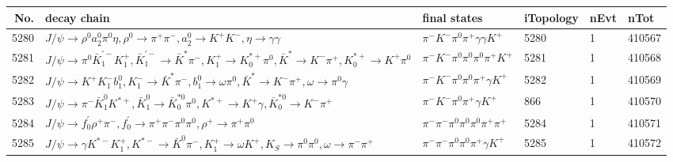 \begin{table}[htbp] 
\begin{center}
\begin{small}
\begin{tabular}{rlllll}\hline\hline
 No. & decay chain & final states &  iTopology & nEvt & nTot \\\hline
5280&$J/\psi       \rightarrow \rho^{0}      a_{2}^{0}      \pi^{0}        \eta          , \rho^{0}       \rightarrow \pi^{+}        \pi^{-}        , a_{2}^{0}       \rightarrow K^{+}          K^{-}          , \eta           \rightarrow \gamma       \gamma       $&$\pi^{-}        K^{-}          \pi^{0}        \pi^{+}        \gamma       \gamma       K^{+}          $& 5280&    1&410567\\
5281&$J/\psi       \rightarrow \pi^{0}        \bar{K}_1^{'-}K_1^{+}        , \bar{K}_1^{'-} \rightarrow \bar{K}^{*}   \pi^{-}        , K_1^{+}         \rightarrow K_{0}^{*+}     \pi^{0}        , \bar{K}^{*}    \rightarrow K^{-}          \pi^{+}        , K_{0}^{*+}      \rightarrow K^{+}          \pi^{0}        $&$\pi^{-}        K^{-}          \pi^{0}        \pi^{0}        \pi^{0}        \pi^{+}        K^{+}          $& 5281&    1&410568\\
5282&$J/\psi       \rightarrow K^{+}          K_{1}^{-}      b_{1}^{0}      , K_{1}^{-}       \rightarrow \bar{K}^{*}   \pi^{-}        , b_{1}^{0}       \rightarrow \omega         \pi^{0}        , \bar{K}^{*}    \rightarrow K^{-}          \pi^{+}        , \omega          \rightarrow \pi^{0}        \gamma       $&$\pi^{-}        K^{-}          \pi^{0}        \pi^{0}        \pi^{+}        \gamma       K^{+}          $& 5282&    1&410569\\
5283&$J/\psi       \rightarrow \pi^{-}        \bar{K}_1^{0} K^{*+}         , \bar{K}_1^{0}  \rightarrow \bar{K}_0^{*0}\pi^{0}        , K^{*+}          \rightarrow K^{+}          \gamma       , \bar{K}_0^{*0} \rightarrow K^{-}          \pi^{+}        $&$\pi^{-}        K^{-}          \pi^{0}        \pi^{+}        \gamma       K^{+}          $&  866&    1&410570\\
5284&$J/\psi       \rightarrow f^{'}_{0}     \rho^{+}      \pi^{-}        , f^{'}_{0}      \rightarrow \pi^{+}        \pi^{-}        \pi^{0}        \pi^{0}        , \rho^{+}       \rightarrow \pi^{+}        \pi^{0}        $&$\pi^{-}        \pi^{-}        \pi^{0}        \pi^{0}        \pi^{0}        \pi^{+}        \pi^{+}        $& 5284&    1&410571\\
5285&$J/\psi       \rightarrow \gamma       K^{*-}         K_1^{+}        , K^{*-}          \rightarrow \bar{K}^{0}   \pi^{-}        , K_1^{+}         \rightarrow \omega         K^{+}          , K_{S}           \rightarrow \pi^{0}        \pi^{0}        , \omega          \rightarrow \pi^{-}        \pi^{+}        $&$\pi^{-}        \pi^{-}        \pi^{0}        \pi^{0}        \pi^{+}        \gamma       K^{+}          $& 5285&    1&410572\\

\end{tabular}
\end{small}
\end{center}
\end{table}
